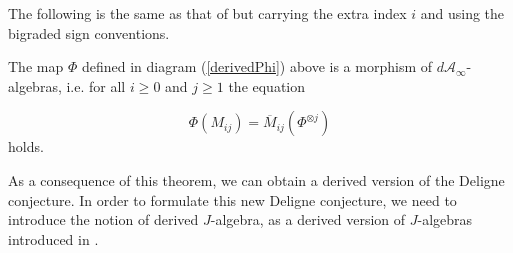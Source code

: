 \documentclass[Thesis.tex]{subfiles}
\begin{document}
The following is the same as that of  but carrying the extra index $i$ and using the bigraded sign conventions.
\begin{thm}\label{bigradedtheorem}
The map $\Phi$ defined in diagram (\ref{derivedPhi}) above is a morphism of $d\mathcal{A}_\infty$-algebras, i.e. for all $i\geq 0$ and $j\geq 1$ the equation

\[\Phi(M_{ij})=\overline{M}_{ij}(\Phi^{\otimes j})\]
holds.%
\end{thm}

As a consequence of this theorem, we can obtain a derived version of the Deligne conjecture. In order to formulate this new Deligne conjecture, we need to introduce the notion of derived $J$-algebra, as a derived version of $J$-algebras introduced in .
\end{document}
